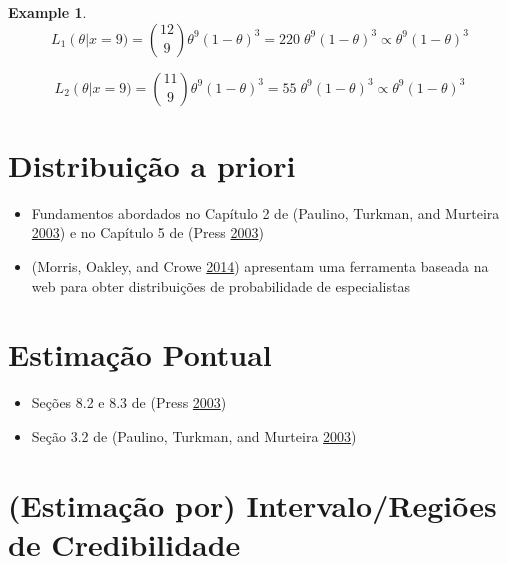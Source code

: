 \documentclass[
]{book}
\providecommand{\tightlist}{%
  \setlength{\itemsep}{0pt}\setlength{\parskip}{0pt}}
\theoremstyle{definition}
\theoremstyle{definition}
\newtheorem{example}{Example}[chapter]
\theoremstyle{definition}
\theoremstyle{remark}
\begin{document}
\begin{example}
\[L_1 \left( \theta \right| x = 9 ) = \binom {12}{9} \theta^{9} \left( 1-\theta \right) ^{3} = 220 \; \theta^{9} \left( 1-\theta \right)^{3} \propto \theta^{9} \left( 1-\theta \right)^{3}\]

\bigskip

\[L_2 \left( \theta \right| x = 9 ) = \binom {11}{9} \theta^{9} \left( 1-\theta \right) ^{3} = 55 \; \theta^{9} \left( 1-\theta \right)^{3} \propto \theta^{9} \left( 1-\theta \right)^{3}\]
\end{example}

\hypertarget{distribuiuxe7uxe3o-a-priori}{%
\section{Distribuição a priori}\label{distribuiuxe7uxe3o-a-priori}}

\begin{itemize}
\tightlist
\item
  Fundamentos abordados no Capítulo 2 de (Paulino, Turkman, and Murteira \protect\hyperlink{ref-paulino2003estatistica}{2003}) e no Capítulo 5 de (Press \protect\hyperlink{ref-press2003subjective}{2003})\\
\item
  (Morris, Oakley, and Crowe \protect\hyperlink{ref-morris2014web}{2014}) apresentam uma ferramenta baseada na web para obter distribuições de probabilidade de especialistas
\end{itemize}

\hypertarget{estimauxe7uxe3o-pontual-1}{%
\section{Estimação Pontual}\label{estimauxe7uxe3o-pontual-1}}

\begin{itemize}
\tightlist
\item
  Seções 8.2 e 8.3 de (Press \protect\hyperlink{ref-press2003subjective}{2003})\\
\item
  Seção 3.2 de (Paulino, Turkman, and Murteira \protect\hyperlink{ref-paulino2003estatistica}{2003})\\
\end{itemize}

\hypertarget{estimauxe7uxe3o-por-intervaloregiuxf5es-de-credibilidade}{%
\section{(Estimação por) Intervalo/Regiões de Credibilidade}\label{estimauxe7uxe3o-por-intervaloregiuxf5es-de-credibilidade}}
\end{document}
